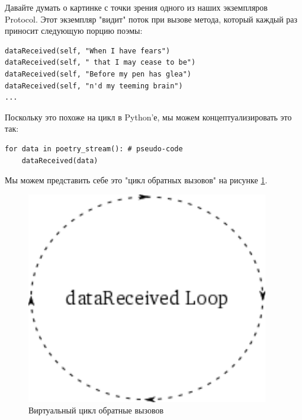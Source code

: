 Давайте думать о картинке с точки зрения одного 
из наших экземпляров Protocol. Этот экземпляр "видит" 
поток при вызове метода, который каждый раз
приносит следующую порцию поэмы:

\begin{scriptsize}\begin{verbatim}
dataReceived(self, "When I have fears")
dataReceived(self, " that I may cease to be")
dataReceived(self, "Before my pen has glea")
dataReceived(self, "n'd my teeming brain")
...
\end{verbatim}\end{scriptsize}

Поскольку это похоже на цикл в Python'е, 
мы можем концептуализировать это так:

\begin{scriptsize}\begin{verbatim}
for data in poetry_stream(): # pseudo-code
    dataReceived(data)
\end{verbatim}\end{scriptsize}

Мы можем представить себе это "цикл обратных вызовов" на 
рисунке \ref{fig:callback-loop}.

\begin{figure}[h]
\begin{center}
    \includegraphics[height=0.3\textheight]{images/callback-loop.pdf}
    \caption{Виртуальный цикл обратные вызовов\label{fig:callback-loop}}
\end{center}
\end{figure}


